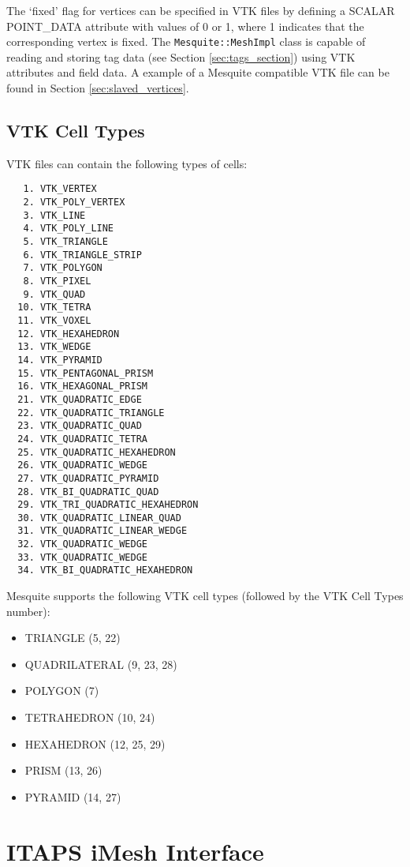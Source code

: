 The `fixed' flag for vertices can be specified in VTK files by defining a
SCALAR POINT\_DATA attribute with values of 0 or 1, where 1 indicates that the
corresponding vertex is fixed.  The \texttt{Mesquite::MeshImpl} class is capable
of reading and storing tag data (see Section \ref{sec:tags_section}) using VTK attributes and field data. A example of a Mesquite compatible VTK file can be found in Section \ref{sec:slaved_vertices}. 

\subsection{VTK Cell Types}
VTK files can contain the following types of cells:

\begin{verbatim}
   1. VTK_VERTEX 
   2. VTK_POLY_VERTEX 
   3. VTK_LINE 
   4. VTK_POLY_LINE 
   5. VTK_TRIANGLE
   6. VTK_TRIANGLE_STRIP 
   7. VTK_POLYGON 
   8. VTK_PIXEL 
   9. VTK_QUAD 
  10. VTK_TETRA 
  11. VTK_VOXEL 
  12. VTK_HEXAHEDRON 
  13. VTK_WEDGE 
  14. VTK_PYRAMID 
  15. VTK_PENTAGONAL_PRISM 
  16. VTK_HEXAGONAL_PRISM 
  21. VTK_QUADRATIC_EDGE 
  22. VTK_QUADRATIC_TRIANGLE 
  23. VTK_QUADRATIC_QUAD 
  24. VTK_QUADRATIC_TETRA 
  25. VTK_QUADRATIC_HEXAHEDRON 
  26. VTK_QUADRATIC_WEDGE 
  27. VTK_QUADRATIC_PYRAMID 
  28. VTK_BI_QUADRATIC_QUAD 
  29. VTK_TRI_QUADRATIC_HEXAHEDRON 
  30. VTK_QUADRATIC_LINEAR_QUAD 
  31. VTK_QUADRATIC_LINEAR_WEDGE 
  32. VTK_QUADRATIC_WEDGE 
  33. VTK_QUADRATIC_WEDGE 
  34. VTK_BI_QUADRATIC_HEXAHEDRON 
\end{verbatim}

Mesquite supports the following VTK cell types (followed by the VTK Cell Types number):

\begin{itemize}
\item  TRIANGLE (5, 22)
\item  QUADRILATERAL (9, 23, 28)
\item  POLYGON (7)
\item  TETRAHEDRON (10, 24)
\item  HEXAHEDRON (12, 25, 29)
\item PRISM (13, 26)
\item  PYRAMID (14, 27)
\end{itemize}

\section{ITAPS iMesh Interface}

